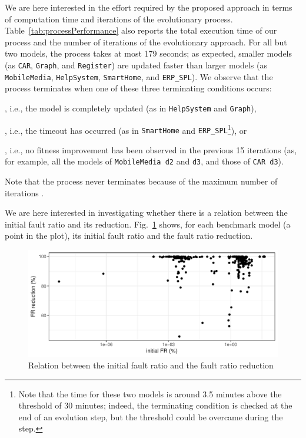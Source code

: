 \begin{tikzborder}{\cite{Gargantini16:validation}}
\begin{tikzborder}{\cite{gargantini_combinatorial_2017}}
\begin{tikzborder}{\cite{gargantini_combinatorial_2017}}
\begin{tikzborder}{\cite{garn2019}}
\begin{tikzborder}{\cite{arcaini2019achieving}}
	We are here interested in the effort required by the proposed approach in terms of computation time and iterations of the evolutionary process. Table~\ref{tab:processPerformance} also reports the total execution time of our process and the number of iterations of the evolutionary approach. For all but two models, the process takes at most 179 seconds; as expected, smaller models (as {\tt CAR}, {\tt Graph}, and {\tt Register}) are updated faster than larger models (as {\tt Mobile\-Media}, {\tt Help\-System}, {\tt Smart\-Home}, and {\tt ERP\_SPL}). We observe that the process terminates when one of these three terminating conditions occurs:
	\begin{inparaenum}[(i)]
		\item \thF, i.e., the model is completely updated (as in {\tt Help\-System} and {\tt Graph}),
		\item \thT, i.e., the timeout has occurred (as in {\tt Smart\-Home} and {\tt ERP\_SPL}\footnote{Note that the time for these two models is around 3.5 minutes above the threshold \thT of 30 minutes; indeed, the terminating condition is checked at the end of an evolution step, but the threshold could be overcame during the step.}), or
		\item \thNI, i.e., no fitness improvement has been observed in the previous 15 iterations (as, for example, all the models of {\tt Mobile\-Media d2} and {\tt d3}, and those of {\tt CAR d3}).
	\end{inparaenum}
	Note that the process never terminates because of the maximum number of iterations \thI.
	
	
	We are here interested in investigating whether there is a relation between the initial fault ratio and its reduction. Fig.~\ref{fig:frRepair} shows, for each benchmark model (a point in the plot), its initial fault ratio and the fault ratio reduction. \be
	
	\begin{figure}[h]
		\centering
		\includegraphics[width=.8\textwidth]{frRepairRed}
		\caption{Relation between the initial fault ratio and the fault ratio reduction}
		\label{fig:frRepair}
	\end{figure}
	

\end{tikzborder}
\end{tikzborder}
\end{tikzborder}
\end{tikzborder}
\end{tikzborder}
